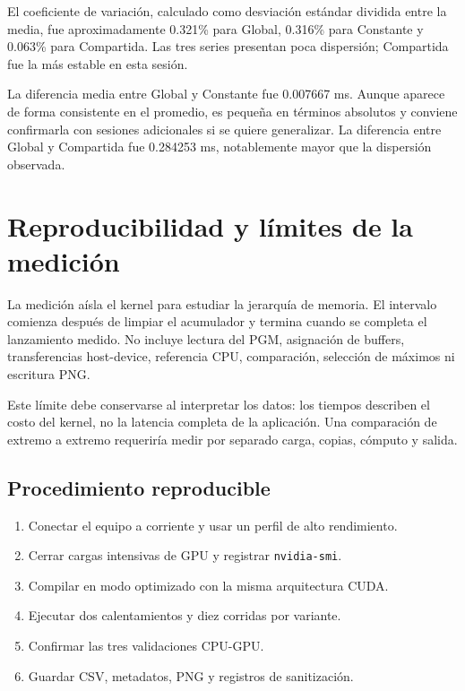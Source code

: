 \documentclass[12pt,letterpaper]{article}
\begin{document}
El coeficiente de variación, calculado como desviación estándar dividida entre la media, fue aproximadamente 0.321\% para Global, 0.316\% para Constante y 0.063\% para Compartida. Las tres series presentan poca dispersión; Compartida fue la más estable en esta sesión.

La diferencia media entre Global y Constante fue 0.007667 ms. Aunque aparece de forma consistente en el promedio, es pequeña en términos absolutos y conviene confirmarla con sesiones adicionales si se quiere generalizar. La diferencia entre Global y Compartida fue 0.284253 ms, notablemente mayor que la dispersión observada.

\section{Reproducibilidad y límites de la medición}

La medición aísla el kernel para estudiar la jerarquía de memoria. El intervalo comienza después de limpiar el acumulador y termina cuando se completa el lanzamiento medido. No incluye lectura del PGM, asignación de buffers, transferencias host-device, referencia CPU, comparación, selección de máximos ni escritura PNG.

Este límite debe conservarse al interpretar los datos: los tiempos describen el costo del kernel, no la latencia completa de la aplicación. Una comparación de extremo a extremo requeriría medir por separado carga, copias, cómputo y salida.

\subsection{Procedimiento reproducible}

\begin{enumerate}
  \item Conectar el equipo a corriente y usar un perfil de alto rendimiento.
  \item Cerrar cargas intensivas de GPU y registrar \texttt{nvidia-smi}.
  \item Compilar en modo optimizado con la misma arquitectura CUDA.
  \item Ejecutar dos calentamientos y diez corridas por variante.
  \item Confirmar las tres validaciones CPU-GPU.
  \item Guardar CSV, metadatos, PNG y registros de sanitización.
\end{enumerate}
\end{document}

